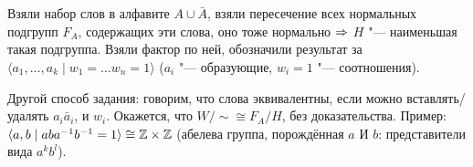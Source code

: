 \section{} %
Взяли набор слов в алфавите $A \cup \bar A$, взяли пересечение всех нормальных подгрупп $F_A$,
содержащих эти слова, оно тоже нормально $\Rightarrow$ $H$ "--- наименьшая такая подгруппа.
Взяли фактор по ней, обозначили результат за $\langle a_1, \dots, a_k \mid w_1 = \dots w_n = 1 \rangle$
($a_i$ "--- образующие, $w_i=1$ "--- соотношения).

Другой способ задания: говорим, что слова эквивалентны, если можно вставлять/удалять
$a_i\bar a_i$, и $w_i$.
Окажется, что $W/\sim \cong F_A/H$, без доказательства.
Пример: $\langle a, b \mid aba^{-1}b^{-1} = 1 \rangle \cong \mathbb{Z} \times \mathbb{Z}$
(абелева группа, порождённая $a$ И $b$: представители вида $a^kb^l$).
